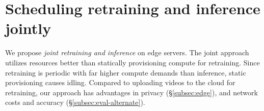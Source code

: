 \section{Scheduling retraining and inference jointly}
\label{sec:ekya_motivation}

We propose \emph{joint retraining and inference} on edge servers.
The joint approach utilizes resources better than statically provisioning compute for retraining. Since retraining is periodic \cite{distribution-20, mullapudi2019} with far higher compute demands than inference, static provisioning causes idling.  
Compared to uploading videos to the cloud for retraining, our approach has advantages in privacy (\S\ref{subsec:edge}), and network costs and accuracy (\S\ref{subsec:eval-alternate}).


